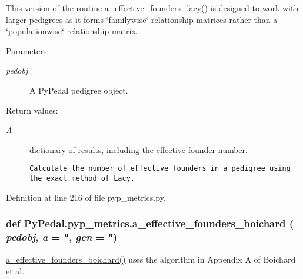 This version of the routine \hyperlink{namespacePyPedal_1_1pyp__metrics_3e7338b4892ff4cdedeb907a08114414}{a\_\-effective\_\-founders\_\-lacy()} is designed to work with larger pedigrees as it forms \char`\"{}familywise\char`\"{} relationship matrices rather than a \char`\"{}populationwise\char`\"{} relationship matrix. \begin{Desc}
\item[Parameters:]
\begin{description}
\item[{\em pedobj}]A Py\-Pedal pedigree object. \end{description}
\end{Desc}
\begin{Desc}
\item[Return values:]
\begin{description}
\item[{\em A}]dictionary of results, including the effective founder number.

\footnotesize\begin{verbatim}Calculate the number of effective founders in a pedigree using the exact method of Lacy.
\end{verbatim}
\normalsize
 \end{description}
\end{Desc}


Definition at line 216 of file pyp\_\-metrics.py.\hypertarget{namespacePyPedal_1_1pyp__metrics_2bd174a8cf151ec7b4ed7af7411858b0}{
\subsubsection[a\_\-effective\_\-founders\_\-boichard]{\setlength{\rightskip}{0pt plus 5cm}def Py\-Pedal.pyp\_\-metrics.a\_\-effective\_\-founders\_\-boichard ( {\em pedobj},  {\em a} = {\tt ''},  {\em gen} = {\tt ''})}}
\label{namespacePyPedal_1_1pyp__metrics_2bd174a8cf151ec7b4ed7af7411858b0}


\hyperlink{namespacePyPedal_1_1pyp__metrics_2bd174a8cf151ec7b4ed7af7411858b0}{a\_\-effective\_\-founders\_\-boichard()} uses the algorithm in Appendix A of Boichard et al. 


